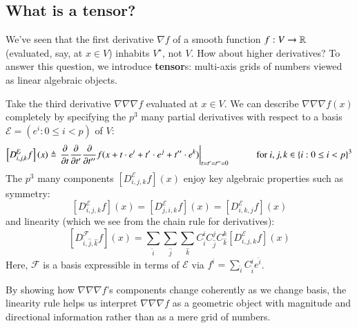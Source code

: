 \documentclass[anon,12pt]{colt2021} %
\begin{document}
{        \subsection{What is a tensor?}
            We've seen that the first derivative $\nabla f$ of a smooth function
            $f:V\to \mathbb{R}$ (evaluated, say, at $x\in V$) inhabits $V^\star$, not
            $V$.  How about higher derivatives?  To answer this question, we
            introduce \textbf{tensor}s: multi-axis grids of numbers viewed
            as linear algebraic objects.

            Take the third derivative $\nabla\nabla\nabla f$ evaluated at
            $x\in V$.  We can describe $\nabla\nabla\nabla f(x)$ completely by
            specifying the $p^3$ many partial derivatives with respect to a
            basis
            $\mathcal{E} = (e^i: 0\leq i<p)$ of $V$:
            $$ 
                \left[D_{i,j,k}^{\mathcal{E}} f\right](x)
                \triangleq 
                \left.
                \frac{\partial}{\partial t}
                \frac{\partial}{\partial t^{\prime}}
                \frac{\partial}{\partial t^{\prime\prime}}
                f(x + t                \cdot e^i
                    + t^{\prime}       \cdot e^j
                    + t^{\prime\prime} \cdot e^k)
                \right|_{t=t^\prime=t^{\prime\prime}=0}
                \hspace{1.0cm}
                \text{for $i,j,k\in \{i: 0\leq i<p\}^3$}
            $$
            The $p^3$ many components
            $
                \left[D_{i,j,k}^{\mathcal{E}} f\right](x)
            $
            enjoy key algebraic properties such as symmetry:
            $$
                \left[D_{i,j,k}^{\mathcal{E}} f\right](x)
                =
                \left[D_{j,i,k}^{\mathcal{E}} f\right](x)
                =
                \left[D_{i,k,j}^{\mathcal{E}} f\right](x)
            $$
            and linearity (which we see from the chain rule for derivatives):
            $$
                \left[D_{\hat i,\hat j,\hat k}^{\mathcal{F}} f\right](x)
                =
                \sum_{\hat i} 
                \sum_{\hat j}
                \sum_{\hat k}
                C_{\hat i}^i
                C_{\hat j}^j
                C_{\hat k}^k
                \left[D_{i,j,k}^{\mathcal{E}} f\right](x)
            $$
            Here, $\mathcal{F}$ is a basis expressible in terms of
            $\mathcal{E}$ via $f^i = \sum_{\hat i} C^i_{\hat i} e^{\hat i}$.

            By showing how $\nabla\nabla\nabla f$'s components change
            coherently as we change basis, the linearity rule helps us
            interpret $\nabla\nabla\nabla f$ as a geometric object with
            magnitude and directional information rather than as a mere grid of
            numbers.

}
\end{document}
